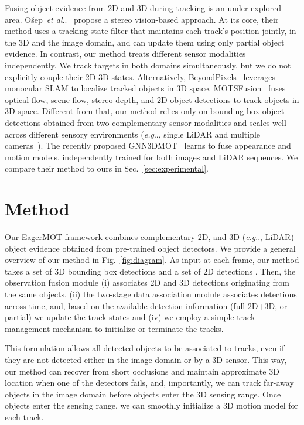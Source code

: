 \documentclass[letterpaper, 10 pt, conference]{ieeeconf}
\makeatletter
\DeclareRobustCommand\onedot{\futurelet\@let@token\@onedot}
\def\@onedot{\ifx\@let@token.\else.\null\fi\xspace}
\def\eg{\emph{e.g}\onedot} \def\Eg{\emph{E.g}\onedot}
\def\etal{\emph{et al}\onedot}
\newcommand{\PAR}[1]{\vskip4pt \noindent {\bf #1~}}
\makeatother
\begin{document}
\PAR{Fusion-based methods.} 
Fusing object evidence from 2D and 3D during tracking is an under-explored area. 
O\v{s}ep~\etal~\cite{Osep17ICRA} propose a stereo vision-based approach. At its core, their method uses a tracking state filter that maintains each track's position jointly, in the 3D and the image domain, and can update them using only partial object evidence.
{In contrast, our method treats different sensor modalities independently. We track targets in both domains simultaneously, but we do not explicitly couple their 2D-3D states.} Alternatively, BeyondPixels~\cite{Sharma18ICRA} leverages monocular SLAM to localize tracked objects in 3D space.
MOTSFusion~\cite{luiten19arxiv} fuses optical flow, scene flow, stereo-depth, and 2D object detections to track objects in 3D space. 
Different from that, our method relies only on bounding box object detections obtained from two complementary sensor modalities and scales well across different sensory environments (\eg, single LiDAR and multiple cameras~\cite{nuscenes2019}).
The recently proposed GNN3DMOT~\cite{weng20cvpr} learns to fuse appearance and motion models, independently trained for both images and LiDAR sequences. We compare their method to ours in Sec.~\ref{sec:experimental}.



\section{Method}

Our EagerMOT framework combines complementary 2D, and 3D (\eg, LiDAR) object evidence obtained from pre-trained object detectors. We provide a general overview of our method in Fig.~\ref{fig:diagram}. 
As input at each frame, our method takes a set of 3D bounding box detections  and a set of 2D detections . Then, the observation fusion module (i) associates 2D and 3D detections originating from the same objects, (ii) the two-stage data association module associates detections across time, and, based on the available detection information (full 2D+3D, or partial) we update the track states and (iv) we employ a simple track management mechanism to initialize or terminate the tracks. 

This formulation allows all detected objects to be associated to tracks, even if they are not detected either in the image domain or by a 3D sensor. This way, our method can recover from short occlusions and maintain approximate 3D location when one of the detectors fails, and, importantly, we can track far-away objects in the image domain before objects enter the 3D sensing range. Once objects enter the sensing range, we can smoothly initialize a 3D motion model for each track. 
\end{document}
